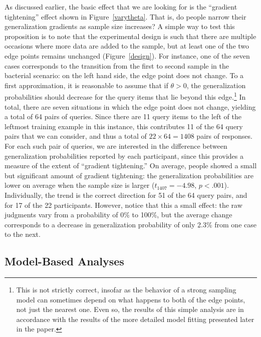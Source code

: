 \documentclass[doc]{apa6}
\begin{document}
As discussed earlier, the basic effect that we are looking for is the ``gradient tightening'' effect shown in Figure~\ref{varytheta}. That is, do people narrow their generalization gradients as sample size increases? A simple way to test this proposition is to note that the experimental design is such that there are multiple occasions where more data are added to the sample, but at least one of the two edge points remains unchanged (Figure~\ref{design}). For instance, one of the seven cases corresponds to the transition from the first to second sample in the bacterial scenario: on the left hand side, the edge point does not change. To a first approximation, it is reasonable to assume that if $\theta>0$, the generalization probabilities should decrease for the query items that lie beyond this edge.\footnote{This is not strictly correct, insofar as the behavior of a strong sampling model can sometimes depend on what happens to both of the edge points, not just the nearest one. Even so, the results of this simple analysis are in accordance with the results of the more detailed model fitting presented later in the paper.}   In total, there are seven situations in which the edge point does not change, yielding a total of 64 pairs of queries.  Since there are 11 query items to the left of the leftmost training example in this instance, this contributes 11 of the 64 query pairs that we can consider, and thus a total of $22 \times 64 = 1408$ pairs of responses. For each such pair of queries, we are interested in the difference between generalization probabilities reported by each participant, since this provides a measure of the extent of ``gradient tightening.'' On average, people showed a small but significant amount of gradient tightening:  the generalization probabilities are lower on average when the sample size is larger ($t_{1407}=-4.98$, $p<.001$). Individually, the trend is the correct direction for 51 of the 64 query pairs, and for 17 of the 22 participants. However, notice that this a small effect: the raw judgments vary from a probability of 0\% to 100\%, but the average change corresponds to a decrease in generalization probability of only 2.3\% from one case to the next.



\subsection{Model-Based Analyses}
\end{document}
